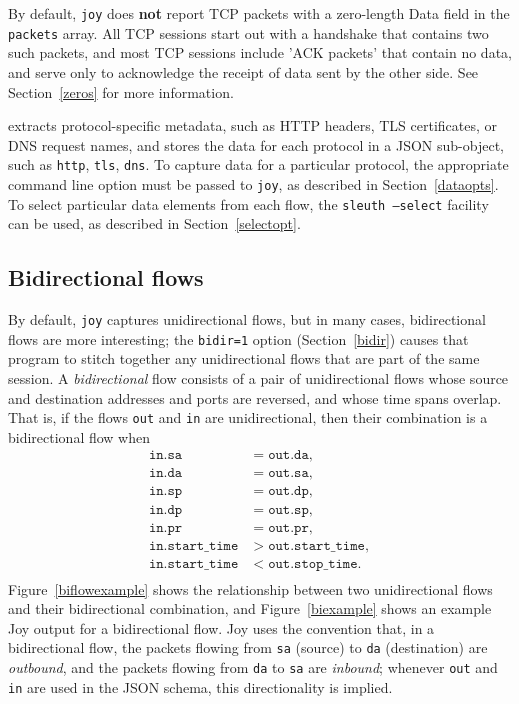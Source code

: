 \documentclass{book}
\begin{document}
By default, \texttt{joy} does \textbf{not} report TCP packets with a
zero-length Data field in the \texttt{packets} array.  All TCP
sessions start out with a handshake that contains two such packets,
and most TCP sessions include 'ACK packets' that contain no data, and
serve only to acknowledge the receipt of data sent by the other side.
See Section~\ref{zeros} for more information.

 extracts protocol-specific metadata, such as HTTP headers,
TLS certificates, or DNS request names, and stores the data for each
protocol in a JSON sub-object, such as \texttt{http}, \texttt{tls},
\texttt{dns}.  To capture data for a particular protocol, the
appropriate command line option must be passed to \texttt{joy}, as
described in Section~\ref{dataopts}.  To select particular data
elements from each flow, the \texttt{sleuth --select} facility can be
used, as described in Section~\ref{selectopt}.


\subsection{Bidirectional flows}
\label{biflow}
By default, \texttt{joy} captures unidirectional flows, but in many
cases, bidirectional flows are more interesting; the \texttt{bidir=1}
option (Section~\ref{bidir}) causes that program to stitch together
any unidirectional flows that are part of the same session.  A
\textit{bidirectional} flow consists of a pair of unidirectional flows
whose source and destination addresses and ports are reversed, and
whose time spans overlap.  That is, if the flows \texttt{out} and
\texttt{in} are unidirectional, then their combination is a
bidirectional flow when
\begin{align}                          \nonumber
\texttt{in.sa} & = \texttt{out.da}, \\ \nonumber
\texttt{in.da} & = \texttt{out.sa}, \\ \nonumber
\texttt{in.sp} & = \texttt{out.dp}, \\ 
\texttt{in.dp} & = \texttt{out.sp}, \\ \nonumber
\texttt{in.pr} & = \texttt{out.pr}, \\ \nonumber
\texttt{in.start\_time} & > \texttt{out.start\_time}, \\ \nonumber
\texttt{in.start\_time} & < \texttt{out.stop\_time}. \\ \nonumber
\end{align}
Figure~\ref{biflowexample} shows the relationship between two
unidirectional flows and their bidirectional combination, and
Figure~\ref{biexample} shows an example Joy output for a bidirectional
flow.  Joy uses the convention that, in a bidirectional flow, the
packets flowing from \texttt{sa} (source) to \texttt{da} (destination)
are \textit{outbound}, and the packets flowing from \texttt{da} to
\texttt{sa} are \textit{inbound}; whenever \texttt{out} and
\texttt{in} are used in the JSON schema, this directionality is
implied.
\end{document}
